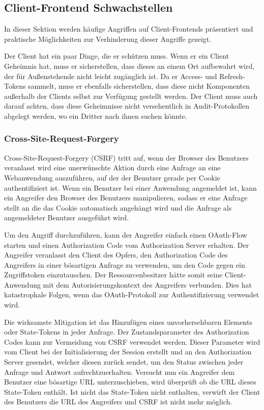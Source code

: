 \subsection{Client-Frontend Schwachstellen}

In dieser Sektion werden häufige Angriffen auf Client-Frontends präsentiert und praktische Möglichkeiten zur Verhinderung dieser Angriffe gezeigt.

Der Client hat ein paar Dinge, die er schützen muss. Wenn er ein Client Geheimnis hat, muss er sicherstellen, dass dieses an einem Ort aufbewahrt wird, der für Außenstehende nicht leicht zugänglich ist. Da er Access- und Refresh-Tokens sammelt, muss er ebenfalls sicherstellen, dass diese nicht Komponenten außerhalb der Clients selbst zur Verfügung gestellt werden. Der Client muss auch darauf achten, dass diese Geheimnisse nicht versehentlich in Audit-Protokollen abgelegt werden, wo ein Dritter nach ihnen suchen könnte.

\subsubsection{Cross-Site-Request-Forgery}


Cross-Site-Request-Forgery (CSRF) tritt auf, wenn der Browser des Benutzers veranlasst wird eine unerwünschte Aktion durch eine Anfrage an eine Webanwendung auszuführen, auf der der Benutzer gerade per Cookie authentifiziert ist. Wenn ein Benutzer bei einer Anwendung angemeldet ist, kann ein Angreifer den Browser des Benutzers manipulieren, sodass er eine Anfrage stellt an die das Cookie automatisch angehängt wird und die Anfrage als angemeldeter Benutzer ausgeführt wird. 

Um den Angriff durchzuführen, kann der Angreifer einfach einen OAuth-Flow starten und einen Authorization Code vom Authorization Server erhalten. Der Angreifer veranlasst den Client des Opfers, den Authorization Code des Angreifers in einer bösartigen Anfrage zu verwenden, um den Code gegen ein Zugriffstoken einzutauschen. Der Ressourcenbesitzer hätte somit seine Client-Anwendung mit dem Autorisierungskontext des Angreifers verbunden. Dies hat katastrophale Folgen, wenn das OAuth-Protokoll zur Authentifizierung verwendet wird. \cite{OAuth2inAction}

Die wirksamste Mitigation ist das Hinzufügen eines unvorhersehbaren Elements oder State-Tokens in jeder Anfrage. Der Zustandsparameter des Authorization Codes kann zur Vermeidung von CSRF verwendet werden. Dieser Parameter wird vom Client bei der Initialisierung der Session erstellt und an den Authorization Server gesendet, welcher diesen zurück sendet, um den Status zwischen jeder Anfrage und Antwort aufrechtzuerhalten. Versucht nun ein Angreifer dem Benutzer eine bösartige URL unterzuschieben, wird überprüft ob die URL dieses State-Token enthält. Ist nicht das State-Token nicht enthalten, verwirft der Client des Benutzers die URL des Angreifers und CSRF ist nicht mehr möglich. \cite{OAuth2inAction}

